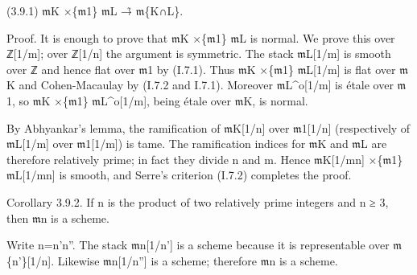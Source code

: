 \documentclass[11pt,a4paper]{article}
\begin{document}
(3.9.1)        \ensuremath{\mathfrak{m}}\textunderscore{}K ×\textunderscore{}\{\ensuremath{\mathfrak{m}}\textunderscore{}1\} \ensuremath{\mathfrak{m}}\textunderscore{}L →̃ \ensuremath{\mathfrak{m}}\textunderscore{}\{K∩L\}.

Proof. It is enough to prove that \ensuremath{\mathfrak{m}}\textunderscore{}K ×\textunderscore{}\{\ensuremath{\mathfrak{m}}\textunderscore{}1\} \ensuremath{\mathfrak{m}}\textunderscore{}L is normal. We prove this over ℤ[1/m]; over ℤ[1/n] the argument is symmetric. The stack \ensuremath{\mathfrak{m}}\textunderscore{}L[1/m] is smooth over ℤ and hence flat over \ensuremath{\mathfrak{m}}\textunderscore{}1 by (I.7.1). Thus \ensuremath{\mathfrak{m}}\textunderscore{}K ×\textunderscore{}\{\ensuremath{\mathfrak{m}}\textunderscore{}1\} \ensuremath{\mathfrak{m}}\textunderscore{}L[1/m] is flat over \ensuremath{\mathfrak{m}}\textunderscore{}K and Cohen-Macaulay by (I.7.2 and I.7.1). Moreover \ensuremath{\mathfrak{m}}\textunderscore{}L\textasciicircum{}o[1/m] is étale over \ensuremath{\mathfrak{m}}\textunderscore{}1, so \ensuremath{\mathfrak{m}}\textunderscore{}K ×\textunderscore{}\{\ensuremath{\mathfrak{m}}\textunderscore{}1\} \ensuremath{\mathfrak{m}}\textunderscore{}L\textasciicircum{}o[1/m], being étale over \ensuremath{\mathfrak{m}}\textunderscore{}K, is normal.

By Abhyankar's lemma, the ramification of \ensuremath{\mathfrak{m}}\textunderscore{}K[1/n] over \ensuremath{\mathfrak{m}}\textunderscore{}1[1/n] (respectively of \ensuremath{\mathfrak{m}}\textunderscore{}L[1/m] over \ensuremath{\mathfrak{m}}\textunderscore{}1[1/m]) is tame. The ramification indices for \ensuremath{\mathfrak{m}}\textunderscore{}K and \ensuremath{\mathfrak{m}}\textunderscore{}L are therefore relatively prime; in fact they divide n and m. Hence \ensuremath{\mathfrak{m}}\textunderscore{}K[1/mn] ×\textunderscore{}\{\ensuremath{\mathfrak{m}}\textunderscore{}1\} \ensuremath{\mathfrak{m}}\textunderscore{}L[1/mn] is smooth, and Serre's criterion (I.7.2) completes the proof.

Corollary 3.9.2. If n is the product of two relatively prime integers and n ≥ 3, then \ensuremath{\mathfrak{m}}\textunderscore{}n is a scheme.

Write n=n'n''. The stack \ensuremath{\mathfrak{m}}\textunderscore{}n[1/n'] is a scheme because it is representable over \ensuremath{\mathfrak{m}}\textunderscore{}\{n'\}[1/n]. Likewise \ensuremath{\mathfrak{m}}\textunderscore{}n[1/n''] is a scheme; therefore \ensuremath{\mathfrak{m}}\textunderscore{}n is a scheme.
\end{document}
